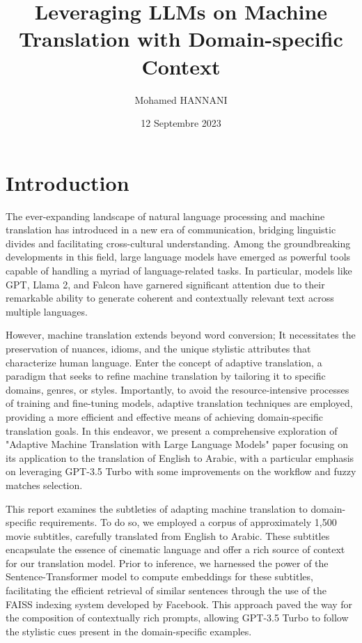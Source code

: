 \documentclass[12pt]{article}
\title{Leveraging LLMs on Machine Translation with Domain-specific Context}
\author{Mohamed HANNANI\\
\AND
\AND
\AND
\AND\AND
\AND
\AND
}
\date{12 Septembre 2023}
\begin{document}
\maketitle

\newpage
\tableofcontents
\thispagestyle{empty}

\newpage
\thispagestyle{empty}




\newpage
\setcounter{page}{1}
\section{Introduction}

The ever-expanding landscape of natural language processing and machine translation has introduced in a new era of communication, bridging linguistic divides and facilitating cross-cultural understanding. Among the groundbreaking developments in this field, large language models have emerged as powerful tools capable of handling a myriad of language-related tasks. In particular, models like GPT, Llama 2, and Falcon have garnered significant attention due to their remarkable ability to generate coherent and contextually relevant text across multiple languages.


However, machine translation extends beyond word conversion; It necessitates the preservation of nuances, idioms, and the unique stylistic attributes that characterize human language. Enter the concept of adaptive translation, a paradigm that seeks to refine machine translation by tailoring it to specific domains, genres, or styles. Importantly, to avoid the resource-intensive processes of training and fine-tuning models, adaptive translation techniques are employed, providing a more efficient and effective means of achieving domain-specific translation goals. In this endeavor, we present a comprehensive exploration of "Adaptive Machine Translation with Large Language Models" paper focusing on its application to the translation of English to Arabic, with a particular emphasis on leveraging GPT-3.5 Turbo with some improvements on the workflow and fuzzy matches selection.


This report examines the subtleties of adapting machine translation to domain-specific requirements. To do so, we employed a corpus of approximately 1,500 movie subtitles, carefully translated from English to Arabic. These subtitles encapsulate the essence of cinematic language and offer a rich source of context for our translation model. Prior to inference, we harnessed the power of the Sentence-Transformer model to compute embeddings for these subtitles, facilitating the efficient retrieval of similar sentences through the use of the FAISS indexing system developed by Facebook. This approach paved the way for the composition of contextually rich prompts, allowing GPT-3.5 Turbo to follow the stylistic cues present in the domain-specific examples.
\end{document}
